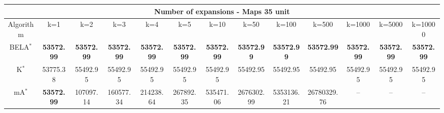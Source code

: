 \begin{tabular}{c|cccccccccccc}\toprule
\multicolumn{13}{c}{Number of expansions - Maps 35 unit}\\ \midrule
Algorithm & k=1 & k=2 & k=3 & k=4 & k=5 & k=10 & k=50 & k=100 & k=500 & k=1000 & k=5000 & k=10000 \\ \midrule
BELA$^*$ & \textbf{53572.99} & \textbf{53572.99} & \textbf{53572.99} & \textbf{53572.99} & \textbf{53572.99} & \textbf{53572.99} & \textbf{53572.99} & \textbf{53572.99} & \textbf{53572.99} & \textbf{53572.99} & \textbf{53572.99} & \textbf{53572.99} \\
K$^*$ & 53775.38 & 55492.95 & 55492.95 & 55492.95 & 55492.95 & 55492.95 & 55492.95 & 55492.95 & 55492.95 & 55492.95 & 55492.95 & 55492.95 \\
mA$^*$ & \textbf{53572.99} & 107097.14 & 160577.34 & 214238.64 & 267892.35 & 535471.06 & 2676302.99 & 5353136.21 & 26780329.76 & -- & -- & -- \\ \bottomrule 
\end{tabular}

